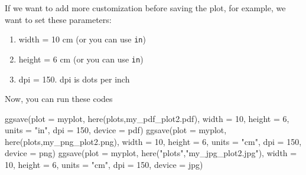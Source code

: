 \documentclass[
]{book}
\makeatletter
\newenvironment{Shaded}{\begin{snugshade}}{\end{snugshade}}
\newcommand{\AttributeTok}[1]{\textcolor[rgb]{0.61,0.61,0.61}{#1}}
\newcommand{\DecValTok}[1]{\textcolor[rgb]{0.06,0.06,0.06}{#1}}
\newcommand{\FunctionTok}[1]{\textcolor[rgb]{0,0,0}{#1}}
\newcommand{\NormalTok}[1]{#1}
\newcommand{\StringTok}[1]{\textcolor[rgb]{0.5,0.5,0.5}{#1}}
\providecommand{\tightlist}{%
  \setlength{\itemsep}{0pt}\setlength{\parskip}{0pt}}
\newenvironment{kframe}{%
\medskip{}
\setlength{\fboxsep}{.8em}
 \def\at@end@of@kframe{}%
 \ifinner\ifhmode%
  \def\at@end@of@kframe{\end{minipage}}%
  \begin{minipage}{\columnwidth}%
 \fi\fi%
 \def\FrameCommand##1{\hskip\@totalleftmargin \hskip-\fboxsep
 \colorbox{shadecolor}{##1}\hskip-\fboxsep
     \hskip-\linewidth \hskip-\@totalleftmargin \hskip\columnwidth}%
 \MakeFramed {\advance\hsize-\width
   \@totalleftmargin\z@ \linewidth\hsize
   \@setminipage}}%
 {\par\unskip\endMakeFramed%
 \at@end@of@kframe}
\renewenvironment{Shaded}{\begin{kframe}}{\end{kframe}}
\makeatother
\begin{document}
If we want to add more customization before saving the plot, for example, we want to set these parameters:

\begin{enumerate}
\def\labelenumi{\arabic{enumi}.}
\tightlist
\item
  width = 10 cm (or you can use \texttt{in})
\item
  height = 6 cm (or you can use \texttt{in})
\item
  dpi = 150. dpi is dots per inch
\end{enumerate}

Now, you can run these codes

\begin{Shaded}
\begin{Highlighting}[]
\FunctionTok{ggsave}\NormalTok{(}\AttributeTok{plot =}\NormalTok{ myplot, }\FunctionTok{here}\NormalTok{(}\StringTok{\textquotesingle{}plots\textquotesingle{}}\NormalTok{,}\StringTok{\textquotesingle{}my\_pdf\_plot2.pdf\textquotesingle{}}\NormalTok{), }
                           \AttributeTok{width =} \DecValTok{10}\NormalTok{, }\AttributeTok{height =} \DecValTok{6}\NormalTok{, }\AttributeTok{units =} \StringTok{"in"}\NormalTok{,}
                           \AttributeTok{dpi =} \DecValTok{150}\NormalTok{, }\AttributeTok{device =} \StringTok{\textquotesingle{}pdf\textquotesingle{}}\NormalTok{)}
\FunctionTok{ggsave}\NormalTok{(}\AttributeTok{plot =}\NormalTok{ myplot, }\FunctionTok{here}\NormalTok{(}\StringTok{\textquotesingle{}plots\textquotesingle{}}\NormalTok{,}\StringTok{\textquotesingle{}my\_png\_plot2.png\textquotesingle{}}\NormalTok{), }
       \AttributeTok{width =} \DecValTok{10}\NormalTok{, }\AttributeTok{height =} \DecValTok{6}\NormalTok{, }\AttributeTok{units =} \StringTok{"cm"}\NormalTok{, }
       \AttributeTok{dpi =} \DecValTok{150}\NormalTok{, }\AttributeTok{device =} \StringTok{\textquotesingle{}png\textquotesingle{}}\NormalTok{)}
\FunctionTok{ggsave}\NormalTok{(}\AttributeTok{plot =}\NormalTok{ myplot, }\FunctionTok{here}\NormalTok{(}\StringTok{"plots"}\NormalTok{,}\StringTok{"my\_jpg\_plot2.jpg"}\NormalTok{), }
       \AttributeTok{width =} \DecValTok{10}\NormalTok{, }\AttributeTok{height =} \DecValTok{6}\NormalTok{, }\AttributeTok{units =} \StringTok{"cm"}\NormalTok{,}
       \AttributeTok{dpi =} \DecValTok{150}\NormalTok{, }\AttributeTok{device =} \StringTok{\textquotesingle{}jpg\textquotesingle{}}\NormalTok{)}
\end{Highlighting}
\end{Shaded}
\end{document}
